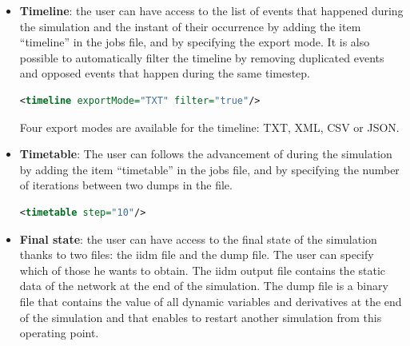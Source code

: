 \documentclass[a4paper, 12pt]{report}
\begin{document}
\begin{itemize}
If filter=``FIRST'', constraints cleared during simulation will be removed and the ones still existing at the end of the simulation are associated to the value seen at the first time step when the constraint appeared.

If filter=``DYNAFLOW'', constraints cleared during simulation will be kept and will contain the last value available (but timestep of the first one), whether that corresponds to the end of the constraint or the end of the simulation. Additionally, the maximum value observed while the constraint was in effect will be exported for each constraint.

\begin{lstlisting}[language=XML, morekeywords={constraints},numbers=none]
<constraints exportMode="TXT" filter="FIRST"/>
\end{lstlisting}
Three export modes are available for constraints: TXT, XML or JSON.

\item \textbf{Timeline}: the user can have access to the list of events that happened during the simulation and the instant of their occurrence by adding the item ``timeline'' in the jobs file, and by specifying the export mode. It is also possible to automatically filter the timeline by removing duplicated events and opposed events that happen during the same timestep.

\begin{lstlisting}[language=XML, morekeywords={timeline},numbers=none]
<timeline exportMode="TXT" filter="true"/>
\end{lstlisting}
Four export modes are available for the timeline: TXT, XML, CSV or JSON.

\item \textbf{Timetable}: The user can follows the advancement of \Dynawo during the simulation by adding the item ``timetable'' in the jobs file, and by specifying the number of iterations between two dumps in the file.

\begin{lstlisting}[language=XML, morekeywords={timeline},numbers=none]
<timetable step="10"/>
\end{lstlisting}

\item \textbf{Final state}: the user can have access to the final state of the simulation thanks to two files: the iidm file and the dump file. The user can specify which of those he wants to obtain. The iidm output file contains the static data of the network at the end of the simulation. The dump file is a binary file that contains the value of all dynamic variables and derivatives at the end of the simulation and that enables to restart another simulation from this operating point.


\end{itemize}
\end{document}
